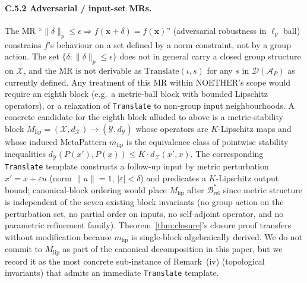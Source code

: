 \documentclass[manuscript]{acmart}
\begin{document}
\paragraph{C.5.2 Adversarial / input-set MRs.}
The MR ``$\| \delta\|_p \le \epsilon \Rightarrow f(\mathbf{x} + \delta) = f(\mathbf{x})$'' (adversarial robustness in $\ell_p$ ball) constrains $f$'s behaviour on a set defined by a norm constraint, not by a group action. The set $\{ \delta : \|\delta\|_p \le \epsilon\}$ does not in general carry a closed group structure on $\mathcal{X}$, and the MR is not derivable as $\mathrm{Translate}(\iota, s)$ for any $s$ in $\mathcal{D}(\mathcal{A}_P)$ as currently defined. Any treatment of this MR within NOETHER's scope would require an eighth block (e.g.\ a metric-ball block with bounded Lipschitz operators), or a relaxation of \texttt{Translate} to non-group input neighbourhoods. A concrete candidate for the eighth block alluded to above is a metric-stability block $M_{\mathrm{lip}} = (\mathcal{X}, d_{\mathcal{X}}) \to (\mathcal{Y}, d_{\mathcal{Y}})$ whose operators are $K$-Lipschitz maps and whose induced MetaPattern $m_{\mathrm{lip}}$ is the equivalence class of pointwise stability inequalities $d_{\mathcal{Y}}(P(x'), P(x)) \le K \cdot d_{\mathcal{X}}(x', x)$. The corresponding \texttt{Translate} template constructs a follow-up input by metric perturbation $x' = x + \varepsilon u$ (norm $\|u\|=1$, $|\varepsilon| < \delta$) and predicates a $K$-Lipschitz output bound; canonical-block ordering would place $M_{\mathrm{lip}}$ after $\mathcal{B}^{*}_{\mathrm{rel}}$ since metric structure is independent of the seven existing block invariants (no group action on the perturbation set, no partial order on inputs, no self-adjoint operator, and no parametric refinement family). Theorem~\ref{thm:closure}'s closure proof transfers without modification because $m_{\mathrm{lip}}$ is single-block algebraically derived. We do not commit to $M_{\mathrm{lip}}$ as part of the canonical decomposition in this paper, but we record it as the most concrete sub-instance of Remark~(iv) (topological invariants) that admits an immediate \texttt{Translate} template.
\end{document}
